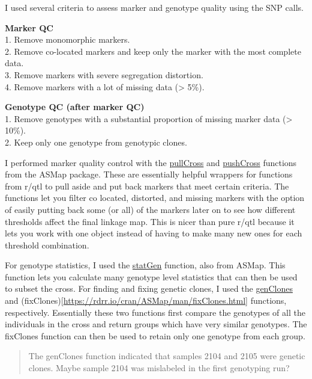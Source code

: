 \documentclass[
]{article}
\begin{document}
I used several criteria to assess marker and genotype quality using the
SNP calls.

\textbf{Marker QC}\\
1. Remove monomorphic markers.\\
2. Remove co-located markers and keep only the marker with the most
complete data.\\
3. Remove markers with severe segregation distortion.\\
4. Remove markers with a lot of missing data (\textgreater{} 5\%).

\textbf{Genotype QC (after marker QC)}\\
1. Remove genotypes with a substantial proportion of missing marker data
(\textgreater{} 10\%).\\
2. Keep only one genotype from genotypic clones.

I performed marker quality control with the
\href{https://rdrr.io/cran/ASMap/man/pullCross.html}{pullCross} and
\href{https://rdrr.io/cran/ASMap/man/pushCross.html}{pushCross}
functions from the ASMap package. These are essentially helpful wrappers
for functions from r/qtl to pull aside and put back markers that meet
certain criteria. The functions let you filter co located, distorted,
and missing markers with the option of easily putting back some (or all)
of the markers later on to see how different thresholds affect the final
linkage map. This is nicer than pure r/qtl because it lets you work with
one object instead of having to make many new ones for each threshold
combination.

For genotype statistics, I used the
\href{https://rdrr.io/cran/ASMap/man/statGen.html}{statGen} function,
also from ASMap. This function lets you calculate many genotype level
statistics that can then be used to subset the cross. For finding and
fixing genetic clones, I used the
\href{https://rdrr.io/cran/ASMap/man/genClones.html}{genClones} and
(fixClones){[}\url{https://rdrr.io/cran/ASMap/man/fixClones.html}{]}
functions, respectively. Essentially these two functions first compare
the genotypes of all the individuals in the cross and return groups
which have very similar genotypes. The fixClones function can then be
used to retain only one genotype from each group.

\begin{quote}
The genClones function indicated that samples 2104 and 2105 were genetic
clones. Maybe sample 2104 was mislabeled in the first genotyping run?
\end{quote}
\end{document}
